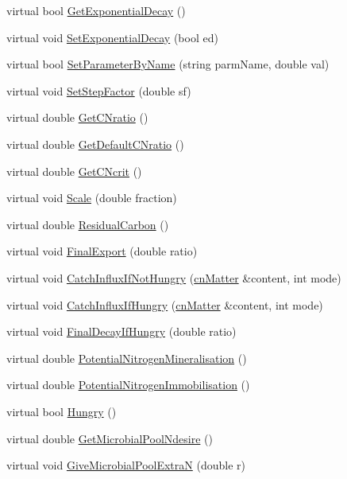 \begin{DoxyCompactItemize}
virtual bool \hyperlink{classmatter_a2795dedbc608b20bc713a17981e181af}{GetExponentialDecay} ()
\item 
virtual void \hyperlink{classmatter_a211b0d822211f4f202803e72b902db0f}{SetExponentialDecay} (bool ed)
\item 
virtual bool \hyperlink{classmatter_a4476cba25191cb4f52471675ae270c04}{SetParameterByName} (string parmName, double val)
\item 
virtual void \hyperlink{classmatter_a850135c585ac81915cac266f0d8e04df}{SetStepFactor} (double sf)
\item 
virtual double \hyperlink{classmatter_a1c97017b5f16dd256b99961f8b50a946}{GetCNratio} ()
\item 
virtual double \hyperlink{classmatter_a96b0fe568fcecda260abc0a5d32ca3da}{GetDefaultCNratio} ()
\item 
virtual double \hyperlink{classmatter_a111bf6b7c88f61e75ed50eac1fc8c3b7}{GetCNcrit} ()
\item 
virtual void \hyperlink{classmatter_a63dd0c869dd3a37857fd9bbaf714cb99}{Scale} (double fraction)
\item 
virtual double \hyperlink{classmatter_abaf880e3b1efd04eae0db055caed9b12}{ResidualCarbon} ()
\item 
virtual void \hyperlink{classmatter_a36bd225841eda2240009df17d239cfa1}{FinalExport} (double ratio)
\item 
virtual void \hyperlink{classmatter_af6764fccc5304bb9832879c40e7c7cba}{CatchInfluxIfNotHungry} (\hyperlink{classcn_matter}{cnMatter} \&content, int mode)
\item 
virtual void \hyperlink{classmatter_abbc0846a0f37653351fbae149fbb91ce}{CatchInfluxIfHungry} (\hyperlink{classcn_matter}{cnMatter} \&content, int mode)
\item 
virtual void \hyperlink{classmatter_a5f04a9ddefede46fd82848148a5fbab8}{FinalDecayIfHungry} (double ratio)
\item 
virtual double \hyperlink{classmatter_a59fa9a6e0ff21bac9ab9fb5b4de9392f}{PotentialNitrogenMineralisation} ()
\item 
virtual double \hyperlink{classmatter_a302a5c72c1cbe1c3d62f01d07f25cd4c}{PotentialNitrogenImmobilisation} ()
\item 
virtual bool \hyperlink{classmatter_a59b4566b93dd22923b97976c752783ef}{Hungry} ()
\item 
virtual double \hyperlink{classmatter_a1af8fc74ce3aed8d761a4a3cd0b98ca0}{GetMicrobialPoolNdesire} ()
\item 
virtual void \hyperlink{classmatter_ad4e8182423face98b556a4620437ade7}{GiveMicrobialPoolExtraN} (double r)

\end{DoxyCompactItemize}
